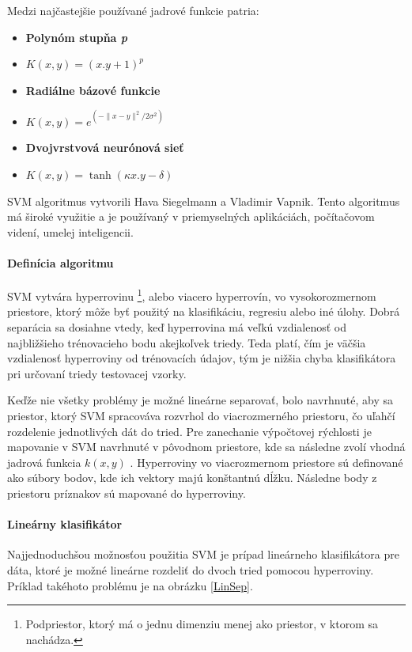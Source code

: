 Medzi najčastejšie používané jadrové funkcie patria:

\begin{itemize}
\item \textbf{Polynóm stupňa \textit{p}}
\item $  K(x,y) = (x.y + 1)^p $
\item \textbf{Radiálne bázové funkcie}
\item $   K(x,y) = e^{(-\|x-y\|^2/2\sigma^2)}  $
\item \textbf{Dvojvrstvová neurónová sieť }
\item $   K(x,y) = \tanh(\kappa x.y - \delta)  $
\end{itemize}

SVM algoritmus vytvorili Hava Siegelmann a Vladimir Vapnik. Tento algoritmus má široké využitie a je používaný v priemyselných aplikáciách, počítačovom videní, umelej inteligencii.  \cite{c7}

\paragraph{Definícia algoritmu}
SVM vytvára hyperrovinu \footnote{Podpriestor, ktorý má o jednu dimenziu menej ako priestor, v ktorom sa nachádza.}, alebo viacero hyperrovín, vo vysokorozmernom priestore, ktorý môže byť použitý na klasifikáciu, regresiu alebo iné úlohy. Dobrá separácia sa dosiahne vtedy, keď hyperrovina má veľkú vzdialenosť od najbližšieho trénovacieho bodu akejkoľvek triedy. Teda platí, čím je väčšia vzdialenosť hyperroviny od trénovacích údajov, tým je nižšia chyba klasifikátora pri určovaní triedy testovacej vzorky.\cite{c12}

Keďže nie všetky problémy je možné lineárne separovať, bolo navrhnuté, aby sa priestor, ktorý SVM spracováva rozvrhol do viacrozmerného priestoru, čo uľahčí rozdelenie jednotlivých dát do tried. Pre zanechanie výpočtovej rýchlosti je mapovanie v SVM navrhnuté v pôvodnom priestore, kde sa následne zvolí vhodná jadrová funkcia $ k(x,y)$ . 
Hyperroviny vo viacrozmernom priestore sú definované ako súbory bodov, kde ich vektory majú konštantnú dĺžku. Následne body z priestoru príznakov sú mapované do hyperroviny. 

\paragraph{Lineárny klasifikátor}
Najjednoduchšou možnosťou použitia SVM je prípad lineárneho klasifikátora pre dáta, ktoré je možné lineárne rozdeliť do dvoch tried pomocou hyperroviny. Príklad takéhoto problému je na obrázku \ref{LinSep}.

